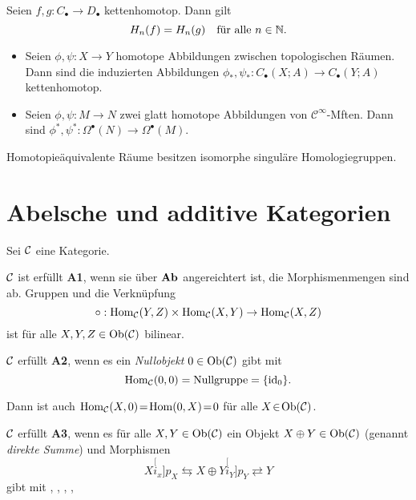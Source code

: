 \documentclass{cheat-sheet}
\newcommand{\CC}[1]{{#1}_{\bullet}} %
\newcommand{\Cont}{\mathcal{C}} %
\begin{document}
\begin{lem}
  Seien $f, g : \CC{C} \to \CC{D}$ kettenhomotop. Dann gilt
  \[ H_n(f) = H_n(g) \quad \text{für alle $n \in \mathbb{N}$.} \]
\end{lem}

\begin{prop}
  \begin{itemize}
    \item Seien $\phi, \psi : X \to Y$ homotope Abbildungen zwischen topologischen Räumen. Dann sind die induzierten Abbildungen $\phi_*, \psi_* : \CC{C}(X; A) \to \CC{C}(Y; A)$ kettenhomotop.
    \item Seien $\phi, \psi : M \to N$ zwei glatt homotope Abbildungen von $\Cont^\infty$-Mften. Dann sind $\phi^*, \psi^* : \Omega^\bullet(N) \to \Omega^\bullet(M)$.
  \end{itemize}
\end{prop}

\begin{kor}
  Homotopieäquivalente Räume besitzen isomorphe singuläre Homologiegruppen.
\end{kor}

\section{Abelsche und additive Kategorien}

Sei $\mathcal{C}$ eine Kategorie.

\begin{axiom}
  $\mathcal{C}$ ist erfüllt \textbf{A1}, wenn sie über $\mathbf{Ab}$ angereichtert ist, \dh{} die Morphismenmengen sind ab. Gruppen und die Verknüpfung
  \[ \circ : \operatorname{Hom}_{\mathcal{C}}(Y, Z) \times \operatorname{Hom}_{\mathcal{C}}(X, Y) \to \operatorname{Hom}_{\mathcal{C}}(X, Z) \]
  ist für alle $X, Y, Z \in \operatorname{Ob}(\mathcal{C})$ bilinear.
\end{axiom}

\begin{axiom}
  $\mathcal{C}$ erfüllt \textbf{A2}, wenn es ein \emph{Nullobjekt} $0 \in \operatorname{Ob}(\mathcal{C})$ gibt mit
  \[ \operatorname{Hom}_{\mathcal{C}}(0, 0) = \text{Nullgruppe} = \{ \operatorname{id}_0 \}. \]
\end{axiom}

\begin{bem}
  Dann ist auch $\operatorname{Hom}_{\mathcal{C}}(X, 0) \!=\! \operatorname{Hom}(0, X) \!=\! 0$ für alle $X \!\in\! \operatorname{Ob}(\mathcal{C})$.
\end{bem}

\begin{axiom}
  $\mathcal{C}$ erfüllt \textbf{A3}, wenn es für alle $X, Y \in \operatorname{Ob}(\mathcal{C})$ ein Objekt $X \oplus Y \in \operatorname{Ob}(\mathcal{C})$ (genannt \emph{direkte Summe}) und Morphismen
  \[ X \stackrel[i_x]{p_X}{\leftrightarrows} X \oplus Y \stackrel[i_Y]{p_Y}{\rightleftarrows} Y \]
  gibt mit
  , \enspace
  , \enspace
  , \enspace
  , \enspace
\end{axiom}
\end{document}
